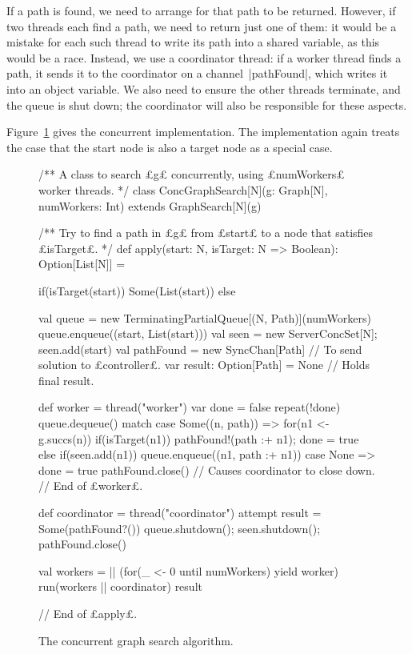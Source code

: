 If a path is found, we need to arrange for that path to be returned. However,
if two threads each find a path, we need to return just one of them: it would
be a mistake for each such thread to write its path into a shared variable, as
this would be a race.  Instead, we use a coordinator thread: if a worker
thread finds a path, it sends it to the coordinator on a channel~|pathFound|,
which writes it into an object variable.  We also need to ensure the other
threads terminate, and the queue is shut down; the coordinator will also be
responsible for these aspects.

Figure~\ref{fig:graph-search-conc} gives the concurrent implementation.  The
implementation again treats the case that the start node is also a target node
as a special case. 



\begin{figure}
\begin{scala}
/** A class to search £g£ concurrently, using £numWorkers£ worker threads. */
class ConcGraphSearch[N](g: Graph[N], numWorkers: Int) 
    extends GraphSearch[N](g){
  /** Try to find a path in £g£ from £start£ to a node that satisfies £isTarget£. */
  def apply(start: N, isTarget: N => Boolean): Option[List[N]] = {
    if(isTarget(start)) Some(List(start))
    else{
      val queue = new TerminatingPartialQueue[(N, Path)](numWorkers)
      queue.enqueue((start, List(start)))
      val seen = new ServerConcSet[N]; seen.add(start)
      val pathFound = new SyncChan[Path] // To send solution to £controller£.
      var result: Option[Path] = None // Holds final result. 

      def worker = thread("worker"){
        var done = false
        repeat(!done){
          queue.dequeue() match{
            case Some((n, path)) =>
              for(n1 <- g.succs(n)){
                if(isTarget(n1)){ pathFound!(path :+ n1); done = true } 
                else if(seen.add(n1)) queue.enqueue((n1, path :+ n1))
              }
            case None => done = true
          }
        }
        pathFound.close() // Causes coordinator to close down.
      } // End of £worker£.

      def coordinator = thread("coordinator"){
        attempt{ result = Some(pathFound?()) }{ }
        queue.shutdown(); seen.shutdown(); pathFound.close()
      }

      val workers = || (for(_ <- 0 until numWorkers) yield worker)
      run(workers || coordinator)
      result
    }
  } // End of £apply£.
}
\end{scala}
\caption{The concurrent graph search algorithm.}
\label{fig:graph-search-conc}
\end{figure}

